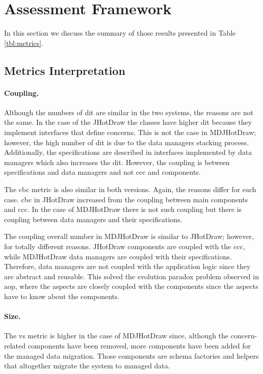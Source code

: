 \section{Assessment Framework}\label{Assessment Framework}
In this section we discuss the summary of those results presented in Table \ref{tbl:metrics}.

\subsection{Metrics Interpretation}

\paragraph{Coupling.} Although the numbers of \acrlong{dit} are similar in the two systems, the reasons are not the same.
In the case of the JHotDraw the classes have higher \ac{dit} because they implement interfaces that define concerns.
This is not the case in MDJHotDraw; however, the high number of \ac{dit} is due to the data managers stacking process.
Additionally, the specifications are described in interfaces implemented by data managers which also increases the \ac{dit}.
However, the coupling is between specifications and data managers and not \ac{ccc} and components.

The \acrlong{cbc} metric is also similar in both versions.
Again, the reasons differ for each case.
\ac{cbc} in JHotDraw increased from the coupling between main components and \ac{ccc}.
In the case of MDJHotDraw there is not such coupling but there is coupling between data managers and their specifications.

The coupling overall number in MDJHotDraw is similar to JHotDraw; however, for totally different reasons.
JHotDraw components are coupled with the \ac{ccc}, while MDJHotDraw data managers are coupled with their specifications.
Therefore, data managers are not coupled with the application logic since they are abstract and reusable.
This solved the evolution paradox \cite{tourwe2003existence} problem observed in \ac{aop}, where the aspects are closely coupled with the components since the aspects have to know about the components.

\paragraph{Size.} The \acrlong{vs} metric is higher in the case of MDJHotDraw since, although the concern-related components have been removed, more components have been added for the managed data migration.
Those components are schema factories and helpers that altogether migrate the system to managed data.

